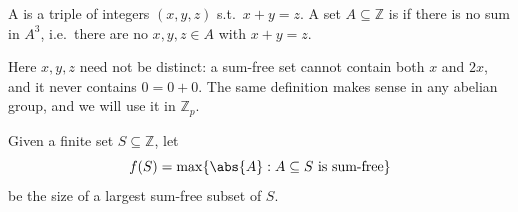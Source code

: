 \begin{definition}\label{def:sum-free}
    A  is a triple of integers \((x, y, z)\) s.t.\ \(x + y = z\). A set \(A \subseteq \mathbb{Z}\) is  if there is no sum in \(A^3\), i.e.\ there are no \(x, y, z \in A\) with \(x + y = z\).
\end{definition}

Here \(x, y, z\) need not be distinct: a sum-free set cannot contain both \(x\) and \(2x\), and it never contains \(0 = 0 + 0\). The same definition makes sense in any abelian group, and we will use it in \(\mathbb{Z}_p\).

\begin{definition}
    Given a finite set \(S \subseteq \mathbb{Z}\), let
    \[
        f(S) = \max\{ \abs{A} : A \subseteq S \text{ is sum-free} \}
    \]
    be the size of a largest sum-free subset of \(S\).
\end{definition}


